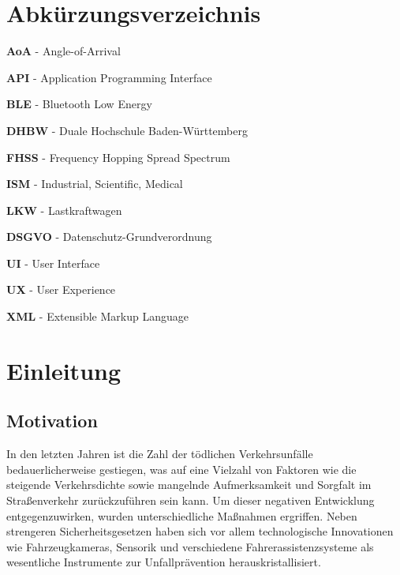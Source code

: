 \documentclass[a4paper, 12pt]{article} %
\begin{document}
\clearpage

\section*{Abkürzungsverzeichnis}

   \textbf{AoA}  - Angle-of-Arrival

   \textbf{API} - Application Programming Interface

   \textbf{BLE} - Bluetooth Low Energy

   \textbf{DHBW} - Duale Hochschule Baden-Württemberg

   \textbf{FHSS} - Frequency Hopping Spread Spectrum

   \textbf{ISM} - Industrial, Scientific, Medical

   \textbf{LKW} - Lastkraftwagen

   \textbf{DSGVO} - Datenschutz-Grundverordnung

   \textbf{UI} - User Interface

   \textbf{UX} - User Experience

   \textbf{XML} - Extensible Markup Language



\clearpage


\tableofcontents

\clearpage

\setcounter{page}{1}

\section{Einleitung}

\subsection{Motivation}
In den letzten Jahren ist die Zahl der tödlichen Verkehrsunfälle bedauerlicherweise gestiegen, was auf eine Vielzahl von Faktoren wie die 
steigende Verkehrsdichte sowie mangelnde Aufmerksamkeit und Sorgfalt im Straßenverkehr zurückzuführen sein kann. 
Um dieser negativen Entwicklung entgegenzuwirken, wurden unterschiedliche Maßnahmen ergriffen. 
Neben strengeren Sicherheitsgesetzen haben sich vor allem technologische Innovationen wie Fahrzeugkameras, 
Sensorik und verschiedene Fahrerassistenzsysteme als wesentliche Instrumente zur Unfallprävention herauskristallisiert.
\end{document}
